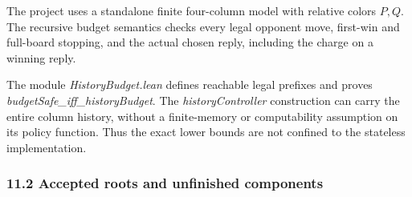 \documentclass[
  a4paper,
]{article}
\begin{document}
The project uses a standalone finite four-column model with relative
colors \(P,Q\). The recursive budget semantics checks every legal
opponent move, first-win and full-board stopping, and the actual chosen
reply, including the charge on a winning reply.

The module \emph{HistoryBudget.lean} defines reachable legal prefixes
and proves \emph{budgetSafe\_iff\_historyBudget}. The
\emph{historyController} construction can carry the entire column
history, without a finite-memory or computability assumption on its
policy function. Thus the exact lower bounds are not confined to the
stateless implementation.

\subsubsection{11.2 Accepted roots and unfinished
components}\label{accepted-roots-and-unfinished-components}
\end{document}
